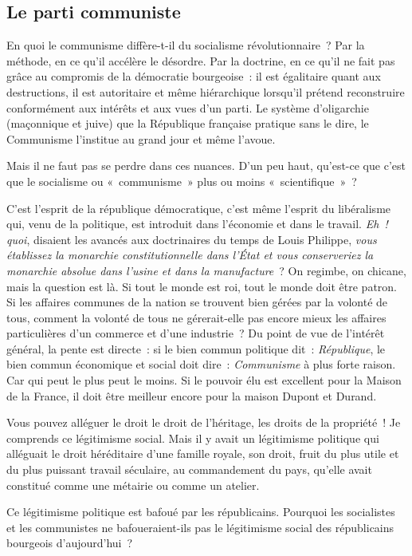 \documentclass[french,twoside]{book} %
\newcommand{\astermono}{\medskip\centerline{\color{rubric}\large\selectfont{\syms ✻}}\medskip\par}%
\begin{document}
\astermono

\subsection[Le parti communiste]{Le parti communiste}
\noindent En quoi le communisme diffère-t-il du socialisme révolutionnaire ? Par la méthode, en ce qu’il accélère le désordre. Par la doctrine, en ce qu’il ne fait pas grâce au compromis de la démocratie bourgeoise : il est égalitaire quant aux destructions, il est autoritaire et même hiérarchique lorsqu’il prétend reconstruire conformément aux intérêts et aux vues d’un parti. Le système d’oligarchie (maçonnique et juive) que la République française pratique sans le dire, le Communisme l’institue au grand jour et même l’avoue.\par
Mais il ne faut pas se perdre dans ces nuances. D’un peu haut, qu’est-ce que c’est que le socialisme ou « communisme » plus ou moins « scientifique » ?\par
C’est l’esprit de la république démocratique, c’est même l’esprit du libéralisme qui, venu de la politique, est introduit dans l’économie et dans le travail. \emph{Eh ! quoi}, disaient les avancés aux doctrinaires du temps de Louis Philippe, \emph{vous établissez la monarchie constitutionnelle dans l’État et vous conserveriez la monarchie absolue dans l’usine et dans la manufacture} ? On regimbe, on chicane, mais la question est là. Si tout le monde est roi, tout le monde doit être patron. Si les affaires communes de la nation se trouvent bien gérées par la volonté de tous, comment la volonté de tous ne gérerait-elle pas encore mieux les affaires particulières d’un commerce et d’une industrie ? Du point de vue de l’intérêt général, la pente est directe : si le bien commun politique dit : \emph{République}, le bien commun économique et social doit dire : \emph{Communisme} à plus forte raison. Car qui peut le plus peut le moins. Si le pouvoir élu est excellent pour la Maison de la France, il doit être meilleur encore pour la maison Dupont et Durand.\par
Vous pouvez alléguer le droit le droit de l’héritage, les droits de la propriété ! Je comprends ce légitimisme social. Mais il y avait un légitimisme politique qui alléguait le droit héréditaire d’une famille royale, son droit, fruit du plus utile et du plus puissant travail séculaire, au commandement du pays, qu’elle avait constitué comme une métairie ou comme un atelier.\par
Ce légitimisme politique est bafoué par les républicains. Pourquoi les socialistes et les communistes ne bafoueraient-ils pas le légitimisme social des républicains bourgeois d’aujourd’hui ?\par
\end{document}
